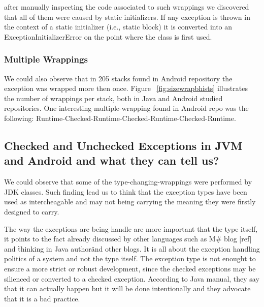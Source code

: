 \documentclass[conference]{IEEEtran}
\begin{document}
after manually inspecting the code associated to such wrappings we discovered that all of them were 
caused by static initializers. If any exception is thrown in the context of a static initializer (i.e., static block) 
it is converted into an ExceptionInitializerError on the point where the class is first used.




\subsubsection{Multiple Wrappings}

We could also observe that in 205 stacks found in Android repository the exception was wrapped 
more then once. Figure ~\ref{fig:sizewrapbhists}  illustrates the number of wrappings per stack, both
 in Java and Android studied repositories. One interesting multiple-wrapping found in Android repo was the 
following: Runtime-Checked-Runtime-Checked-Runtime-Checked-Runtime.

\subsection{Checked and Unchecked Exceptions in JVM and Android and what they can tell us?}

We could observe that some of the type-changing-wrappings were performed by JDK classes.
Such finding lead us to think that the exception types have been used as intercheagable and may not being carrying 
the meaning they were firstly designed to carry.

The way the exceptions are being handle are more important that the type itself, it points to the fact already discussed 
by other languages such as M\# blog [ref] and \"thinking in Java author\" and other blogs. It is all about the exception handling
politics of a system and not the type itself. The exception type is not enought to ensure a more strict or robust development,
since the checked exceptions may be silienced or converted to a checked exception. According to Java manual,
they say that it can actually happen but it will be done intentionally and they advocate that it is a bad practice.
\end{document}
